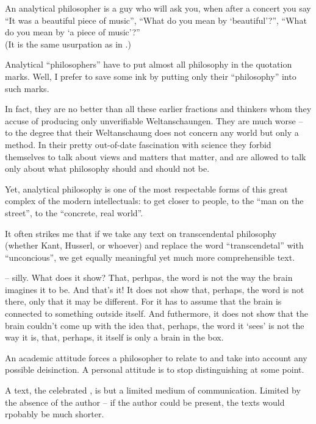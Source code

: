 \pa
An analytical philosopher is a guy who will ask you, when after a concert 
you say ``It was a beautiful piece of music'', ``What do you mean by 
`beautiful'?'', ``What do you mean by `a piece of music'?'' \\
(It is the same usurpation as in .)

\pa
Analytical ``philosophers'' have to put almost all philosophy in the 
quotation marks. Well, I prefer to save some ink by putting only their 
``philosophy'' into such marks.

\pa
In fact, they are no better than all these earlier fractions and thinkers 
whom they accuse of producing only unverifiable Weltanschaungen. They are 
much worse -- to the degree that their Weltanschaung does not concern any 
world but only a method. In their pretty out-of-date fascination with 
science they forbid themselves to talk about views and matters that 
matter, and are allowed to talk only about what philosophy should and 
should not be.

\pa
Yet, analytical philosophy is one of the most respectable forms of this 
great complex of the modern intellectuals: to get closer to people, to the
``man on the street'', to the ``concrete, real world''.

\pa
It often strikes me that if we take any text on transcendental philosophy
(whether Kant, Husserl, or whoever) and replace the word ``transcendetal''
with ``unconcious'', we get equally meaningful yet much more comprehensible
text.

\pa
{} -- silly. What does it show? That, perhpas, the word
is not the way the brain imagines it to be. And that's it! It does not show
that, perhaps, the word is not there, only that it may be different. For it
has to assume that the brain is connected to something outside itself. And
futhermore, it does not show that the brain couldn't come up with the idea
that, perhaps, the word it `sees' is not the way it is, that, perhaps, it
itself is only a brain in the box.

\pa
An academic attitude forces a philosopher to relate to and take into 
account any possible deisinction. A personal attitude is to stop 
distinguishing at some point.


\pa
A text, the celebrated , is but a limited medium of 
communication. Limited by the absence of the author -- if the author 
could be present, the texts would rpobably be much shorter.

